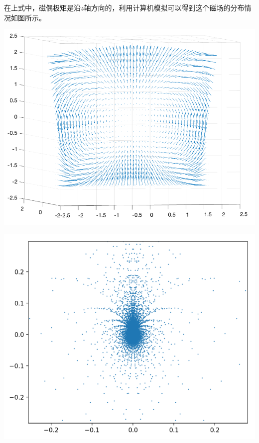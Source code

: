\documentclass{CLGPY}
\begin{document}
\begin{multicols}{1}
在上式中，磁偶极矩是沿$z$轴方向的，利用计算机模拟可以得到这个磁场的分布情况如图所示。
        \begin{center}
            \includegraphics[scale=.2]{./fig/20210615123048.png}
        \end{center}
        \begin{center}
            \includegraphics[scale=.2]{./fig/20210618230811.png}
        \end{center}


\end{multicols}
\end{document}
